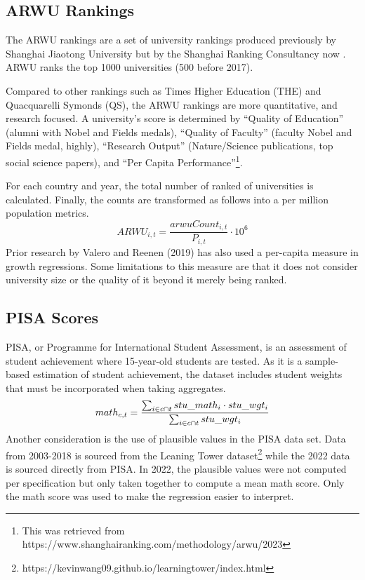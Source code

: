 \documentclass[11pt]{article}
\begin{document}
\subsection{ARWU Rankings}
The ARWU rankings are a set of university rankings produced previously by Shanghai Jiaotong University but by the Shanghai Ranking Consultancy now . ARWU ranks the top 1000 universities (500 before 2017).

Compared to other rankings such as Times Higher Education (THE) and Quacquarelli Symonds (QS), the ARWU rankings are more quantitative, and research focused. A university's score is determined by ``Quality of Education'' (alumni with Nobel and Fields medals), ``Quality of Faculty'' (faculty Nobel and Fields medal, highly), ``Research Output'' (Nature/Science publications, top social science papers), and ``Per Capita Performance''\footnote{This was retrieved from https://www.shanghairanking.com/methodology/arwu/2023}.

For each country and year, the total number of ranked of universities is calculated. Finally, the counts are transformed as follows into a per million population metrics.
\begin{equation}
    ARWU_{i,t} = \frac{arwuCount_{i,t}}{P_{i,t}} \cdot 10^6
\end{equation}
Prior research by Valero and Reenen (2019) has also used a per-capita measure in growth regressions. Some limitations to this measure are that it does not consider university size or the quality of it beyond it merely being ranked.
\subsection{PISA Scores}
PISA, or Programme for International Student Assessment, is an assessment of student achievement where 15-year-old students are tested. As it is a sample-based estimation of student achievement, the dataset includes student weights that must be incorporated when taking aggregates.
\begin{equation}
    math_{c, t} = \frac{\sum_{i \in c \cap t} stu\_math_i \cdot stu\_wgt_i}{\sum_{i \in c \cap t} stu\_wgt_i} \\
\end{equation}
Another consideration is the use of plausible values in the PISA data set. Data from 2003-2018 is sourced from the Leaning Tower dataset\footnote{https://kevinwang09.github.io/learningtower/index.html} while the 2022 data is sourced directly from PISA. In 2022, the plausible values were not computed per specification but only taken together to compute a mean math score. Only the math score was used to make the regression easier to interpret.
\end{document}

